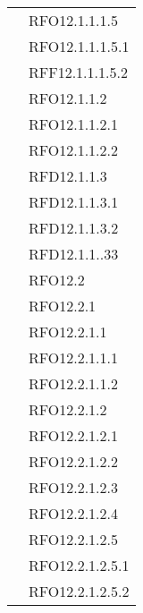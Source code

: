 \begin{longtable}{ p{12cm} | p{3cm} }
& RFO12.1.1.1.5 \\
& RFO12.1.1.1.5.1 \\
& RFF12.1.1.1.5.2 \\
& RFO12.1.1.2 \\
& RFO12.1.1.2.1 \\
& RFO12.1.1.2.2 \\
& RFD12.1.1.3 \\
& RFD12.1.1.3.1 \\
& RFD12.1.1.3.2 \\
& RFD12.1.1..33 \\
& RFO12.2 \\
& RFO12.2.1 \\
& RFO12.2.1.1 \\
& RFO12.2.1.1.1 \\
& RFO12.2.1.1.2 \\
& RFO12.2.1.2 \\
& RFO12.2.1.2.1 \\
& RFO12.2.1.2.2 \\
& RFO12.2.1.2.3 \\
& RFO12.2.1.2.4 \\
& RFO12.2.1.2.5 \\
& RFO12.2.1.2.5.1 \\
& RFO12.2.1.2.5.2 \\
		    

\end{longtable}
